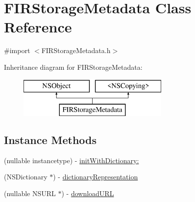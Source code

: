 \hypertarget{interface_f_i_r_storage_metadata}{}\section{F\+I\+R\+Storage\+Metadata Class Reference}
\label{interface_f_i_r_storage_metadata}


{\ttfamily \#import $<$F\+I\+R\+Storage\+Metadata.\+h$>$}

Inheritance diagram for F\+I\+R\+Storage\+Metadata\+:\begin{figure}[H]
\begin{center}
\leavevmode
\includegraphics[height=2.000000cm]{interface_f_i_r_storage_metadata}
\end{center}
\end{figure}
\subsection*{Instance Methods}
\begin{DoxyCompactItemize}
\item 
(nullable instancetype) -\/ \hyperlink{interface_f_i_r_storage_metadata_ae7110ecf4d13cfcfbdbfc0082ebe9599}{init\+With\+Dictionary\+:}
\item 
(N\+S\+Dictionary $\ast$) -\/ \hyperlink{interface_f_i_r_storage_metadata_a72f84cd8844a0f597fb00650bd142e34}{dictionary\+Representation}
\item 
(nullable N\+S\+U\+R\+L $\ast$) -\/ \hyperlink{interface_f_i_r_storage_metadata_a922c94911b4a6e89229abc60b57a7ad3}{download\+U\+R\+L}
\end{DoxyCompactItemize}
